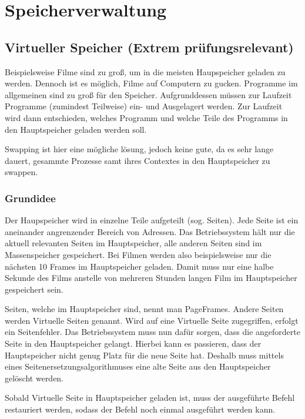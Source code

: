 \chapter{Speicherverwaltung}

\section{Virtueller Speicher (Extrem prüfungsrelevant)}

Beispielsweise Filme sind zu groß, um in die meisten Haupspeicher geladen zu werden. Dennoch ist es möglich, Filme auf Computern zu gucken. Programme im allgemeinen sind zu groß für den Speicher. Aufgrunddessen müssen zur Laufzeit Programme (zumindest Teilweise) ein- und Ausgelagert werden. Zur Laufzeit wird dann entschieden, welches Programm und welche Teile des Programms in den Hauptspeicher geladen werden soll. 

Swapping ist hier eine mögliche lösung, jedoch keine gute, da es sehr lange dauert, gesammte Prozesse samt ihres Contextes in den Hauptspeicher zu swappen.

\subsection{Grundidee}

Der Haupspeicher wird in einzelne Teile aufgeteilt (sog. Seiten). Jede Seite ist ein aneinander angrenzender Bereich von Adressen. Das Betriebssystem hält nur die aktuell relevanten Seiten im Hauptspeicher, alle anderen Seiten sind im Massenspeicher gespeichert. Bei Filmen werden also beispielsweise nur die nächsten 10 Frames im Hauptspeicher geladen. Damit muss nur eine halbe Sekunde des Films anstelle von mehreren Stunden langen Film im Hauptspeicher gespeichert sein.

Seiten, welche im Hauptspeicher sind, nennt man PageFrames. Andere Seiten werden Virtuelle Seiten genannt. Wird auf eine Virtuelle Seite zugegriffen, erfolgt ein Seitenfehler. Das Betriebssystem muss nun dafür sorgen, dass die angeforderte Seite in den Hauptspeicher gelangt. Hierbei kann es passieren, dass der Hauptspeicher nicht genug Platz für die neue Seite hat. Deshalb muss mittels eines Seitenersetzungsalgorithmuses eine alte Seite aus den Hauptspeicher gelöscht werden.

Sobald Virtuelle Seite in Hauptspeicher geladen ist, muss der ausgeführte Befehl restauriert werden, sodass der Befehl noch einmal ausgeführt werden kann.

